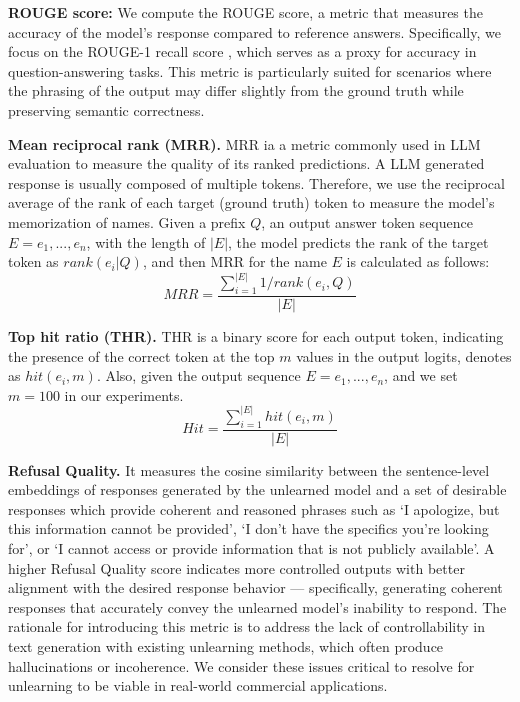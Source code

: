 \textbf{ROUGE score:} We compute the ROUGE score, a metric that measures the accuracy of the model’s response compared to reference answers. Specifically, we focus on the ROUGE-1 recall score \citep{lin2004rouge}, which serves as a proxy for accuracy in question-answering tasks. This metric is particularly suited for scenarios where the phrasing of the output may differ slightly from the ground truth while preserving semantic correctness.

\textbf{Mean reciprocal rank (MRR).} MRR ia a metric commonly used in LLM evaluation to measure the quality of its ranked predictions. A LLM generated response is usually composed of multiple tokens. Therefore, we use the reciprocal average of the rank of each target (ground truth) token to measure the model’s memorization of names. Given a prefix $Q$, an output answer token sequence $E = {e_1, ..., e_n}$, with the length of $|E|$, the model predicts the rank of the target token as
$rank(e_i|Q)$, and then MRR for the name $E$ is calculated as follows:
\begin{equation}
    MRR = \frac{\sum_{i=1}^{|E|} 1/rank(e_i,Q)}{|E|}
\end{equation}

\textbf{Top hit ratio (THR).} THR is a binary score for each output token, indicating the presence of the correct token at the top $m$ values in the output logits, denotes as $hit(e_i, m)$. Also, given the output sequence $E = {e_1, ..., e_n}$, and we set $m=100$ in our experiments.
\begin{equation}
    Hit = \frac{\sum_{i=1}^{|E|}hit(e_i, m)}{|E|}
\end{equation}

\textbf{Refusal Quality.} It measures the cosine similarity between the sentence-level embeddings of responses generated by the unlearned model and a set of desirable responses which provide coherent and reasoned phrases such as `I apologize, but this information cannot be provided', `I don’t have the specifics you’re looking for', or `I cannot access or provide information that is not publicly available'. A higher Refusal Quality score indicates more controlled outputs with better alignment with the desired response behavior — specifically, generating coherent responses that accurately convey the unlearned model's inability to respond. The rationale for introducing this metric is to address the lack of controllability in text generation with existing unlearning methods, which often produce hallucinations \citep{farquhar2024detecting} or incoherence. We consider these issues critical to resolve for unlearning to be viable in real-world commercial applications.


